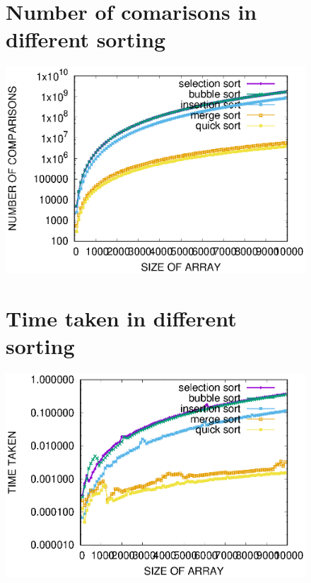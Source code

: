 \documentclass{IEEEtran}
\begin{document}
\begin{figure}
\section{\fontsize{10}{12}Number of comarisons in different sorting}
\includegraphics[width=6in]{comparison_graph.eps}
\section{Time taken in different sorting}
\includegraphics[width=6in]{time_graph.eps}
\end{figure} 
\end{document}
